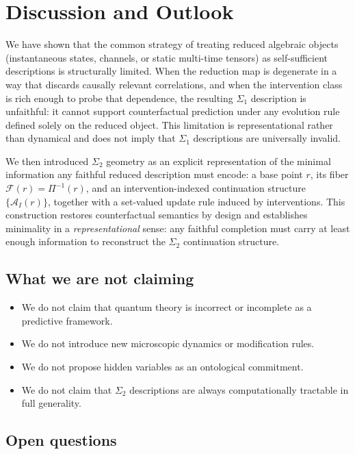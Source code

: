 \section{Discussion and Outlook}
\label{sec:discussion}

We have shown that the common strategy of treating reduced algebraic objects (instantaneous
states, channels, or static multi-time tensors) as self-sufficient descriptions is structurally
limited. When the reduction map is degenerate in a way that discards causally relevant
correlations, and when the intervention class is rich enough to probe that dependence, the
resulting $\Sigma_1$ description is unfaithful: it cannot support counterfactual prediction
under any evolution rule defined solely on the reduced object. This limitation is
representational rather than dynamical and does not imply that $\Sigma_1$ descriptions are
universally invalid.

We then introduced $\Sigma_2$ geometry as an explicit representation of the minimal information
any faithful reduced description must encode: a base point $r$, its fiber
$\mathcal{F}(r)=\Pi^{-1}(r)$, and an intervention-indexed continuation structure
$\{\mathcal{A}_I(r)\}$, together with a set-valued update rule induced by interventions.
This construction restores counterfactual semantics by design and establishes minimality in a
\emph{representational} sense: any faithful completion must carry at least enough information to
reconstruct the $\Sigma_2$ continuation structure.

\subsection{What we are not claiming}

\begin{itemize}
  \item We do not claim that quantum theory is incorrect or incomplete as a predictive framework.
  \item We do not introduce new microscopic dynamics or modification rules.
  \item We do not propose hidden variables as an ontological commitment.
  \item We do not claim that $\Sigma_2$ descriptions are always computationally tractable in full generality.
\end{itemize}

\subsection{Open questions}

